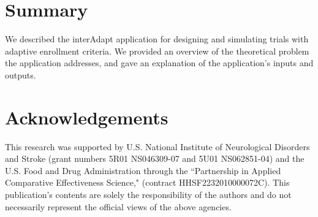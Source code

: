\documentclass{article}
\newcommand{\interAdapt}{\textsf{interAdapt }}
\begin{document}
\section*{Summary}

We described the \interAdapt application for designing and simulating trials with adaptive enrollment criteria. We provided an overview of the theoretical problem the application addresses, and gave an explanation of the application’s inputs and outputs.



\section*{Acknowledgements}
This research was supported by U.S. National Institute of Neurological Disorders and Stroke (grant numbers 5R01 NS046309-07 and 5U01 NS062851-04) and
the U.S.  Food and Drug Administration through the ``Partnership in Applied Comparative Effectiveness Science," (contract HHSF2232010000072C).
This publication's contents are solely the responsibility of the authors and do not necessarily represent the official views of the above agencies.





\end{document}
